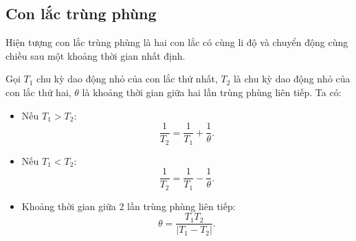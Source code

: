 \subsection{Con lắc trùng phùng}
Hiện tượng con lắc trùng phùng là hai con lắc có cùng li độ và chuyển động cùng chiều sau một khoảng thời gian nhất định.

Gọi $T_1$ chu kỳ dao động nhỏ của con lắc thứ nhất, $T_2$ là chu kỳ dao động nhỏ của con lắc thứ hai, $\theta$ là khoảng thời gian giữa hai lần trùng phùng liên tiếp. Ta có:
\begin{itemize}
	\item Nếu $T_1 >T_2$: \begin{equation*}\dfrac{1}{T_2} = \dfrac{1}{T_1} +\dfrac{1}{\theta}.\end{equation*}
	\item Nếu $T_1 <T_2$: \begin{equation*}\dfrac{1}{T_2} = \dfrac{1}{T_1} -\dfrac{1}{\theta}.\end{equation*}
	\item Khoảng thời gian giữa 2 lần trùng phùng liên tiếp:
	\begin{equation*}
		\theta =\dfrac{T_1T_2}{|T_1-T_2|}.
	\end{equation*}
\end{itemize}
